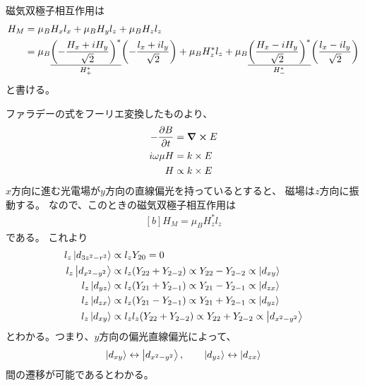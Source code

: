 \documentclass[../ap_2011.tex]{subfiles}
\begin{document}
\section{}
磁気双極子相互作用は
\begin{equation}\begin{aligned}[b]
    H_M &= \mu_BH_xl_x + \mu_BH_yl_z+\mu_BH_zl_z\\
    &=\mu_B\underset{H_+^*}{\underline{\qty(-\frac{H_x+iH_y}{\sqrt{2}})^*}}\qty(-\frac{l_x+il_y}{\sqrt{2}})
    +\mu_BH_z^* l_z
    +\mu_B\underset{H_-^*}{\underline{\qty(\frac{H_x-iH_y}{\sqrt{2}})^*}}\qty(\frac{l_x-il_y}{\sqrt{2}})
\end{aligned}\end{equation}
と書ける。

ファラデーの式をフーリエ変換したものより、
\begin{equation}\begin{aligned}[b]
    -\pdv{B}{t}&=\curl E\\
    i\omega \mu H &= k\times E\\
    H &\propto k\times E
\end{aligned}\end{equation}
\(x\)方向に進む光電場が\(y\)方向の直線偏光を持っているとすると、
磁場は\(z\)方向に振動する。
なので、このときの磁気双極子相互作用は
\begin{equation}\begin{aligned}[b]
    H_M = \mu_BH_z^* l_z
\end{aligned}\end{equation}
である。
これより
\begin{equation}\begin{aligned}[b]
    l_z\ket{d_{3z^2-r^2}} &\propto l_z Y_{20} = 0\\
    l_z\ket{d_{x^2-y^2}} &\propto l_z (Y_{22}+Y_{2-2}) \propto Y_{22}-Y_{2-2} \propto \ket{d_{xy}}\\
    l_z\ket{d_{yz}} &\propto l_z (Y_{21}+Y_{2-1}) \propto Y_{21}-Y_{2-1}\propto \ket{d_{zx}}\\
    l_z\ket{d_{zx}} &\propto l_z (Y_{21}-Y_{2-1}) \propto Y_{21}+Y_{2-1} \propto \ket{d_{yz}}\\
    l_z\ket{d_{xy}} &\propto l_z l_z (Y_{22}+Y_{2-2}) \propto Y_{22}+Y_{2-2} \propto \ket{d_{x^2-y^2}}
\end{aligned}\end{equation}
とわかる。つまり、\(y\)方向の偏光直線偏光によって、
\begin{equation}\begin{aligned}[b]
    \ket{d_{xy}}\leftrightarrow \ket{d_{x^2-y^2}},\qquad \ket{d_{yz}}\leftrightarrow \ket{d_{zx}}
\end{aligned}\end{equation}
間の遷移が可能であるとわかる。
\end{document}
